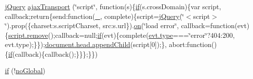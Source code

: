 \begin{DoxyCompactItemize}
\item 
\hyperlink{jquery-3_82_81_8js_a609525712f1102566c2b03866ceb2bba}{j\+Query} \hyperlink{jquery-3_82_81_8js_afe1df54c8525ee0693568b2e53776555}{ajax\+Transport} (\char`\"{}script\char`\"{}, function(s)\{\hyperlink{jquery-3_82_81_8js_ad6cbdd9e1fadb4d9540fff933cdd6fdc}{if}(s.\+cross\+Domain)\{var script, callback;return\{send\+:function(\hyperlink{jquery-3_82_81_8js_a6e69a5af94d7d53886e51f89fb3bd6b4}{\+\_\+}, complete)\{script=\hyperlink{jquery-3_82_81_8js_a609525712f1102566c2b03866ceb2bba}{j\+Query}(\char`\"{}$<$script$>$\char`\"{}).prop(\{charset\+:s.\+script\+Charset, src\+:s.\+url\}).\hyperlink{jquery-3_82_81_8js_a3d6a7b0a44ec72f81c22635b3449282e}{on}(\char`\"{}load error\char`\"{}, callback=function(evt)\{\hyperlink{jquery-3_82_81_8js_a7ddf3a7715404466a918041783666ca8}{script.\+remove}();callback=null;\hyperlink{jquery-3_82_81_8js_ad6cbdd9e1fadb4d9540fff933cdd6fdc}{if}(evt)\{complete(\hyperlink{jquery-3_82_81_8js_a4c4533b7d49de290bb8cccd4e6f43349}{evt.\+type}===\char`\"{}error\char`\"{}?404\+:200, evt.\+type);\}\});\hyperlink{jquery-3_82_81_8js_a788a39803777a0f747f4be364b59be9d}{document.\+head.\+append\+Child}(script\mbox{[}0\mbox{]});\}, abort\+:function()\{\hyperlink{jquery-3_82_81_8js_ad6cbdd9e1fadb4d9540fff933cdd6fdc}{if}(callback)\{callback();\}\}\};\}\})
\item 
\hyperlink{jquery-3_82_81_8js_ad6cbdd9e1fadb4d9540fff933cdd6fdc}{if} (!\hyperlink{jquery-3_82_81_8js_a4efa44664a3416a8180ce5fc876f0346}{no\+Global})
\end{DoxyCompactItemize}
